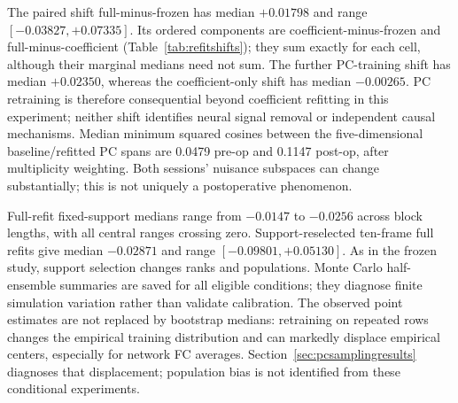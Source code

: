 \documentclass[11pt,a4paper]{article}
\begin{document}
The paired shift full-minus-frozen has median $+0.01798$ and range $[-0.03827,+0.07335]$. Its ordered components are coefficient-minus-frozen and full-minus-coefficient (Table~\ref{tab:refitshifts}); they sum exactly for each cell, although their marginal medians need not sum. The further PC-training shift has median $+0.02350$, whereas the coefficient-only shift has median $-0.00265$. PC retraining is therefore consequential beyond coefficient refitting in this experiment; neither shift identifies neural signal removal or independent causal mechanisms. Median minimum squared cosines between the five-dimensional baseline/refitted PC spans are 0.0479 pre-op and 0.1147 post-op, after multiplicity weighting. Both sessions' nuisance subspaces can change substantially; this is not uniquely a postoperative phenomenon.
\begin{table}[H]\centering\small
\caption{Paired shifts of the longitudinal contrast, fixed support and ten-frame blocks. Every subtraction uses the same SC bootstrap and FC draw, not differences between unpaired distributions.}\label{tab:refitshifts}\end{table}
\begin{table}[H]\centering\scriptsize\setlength{\tabcolsep}{4pt}
\caption{All primary block-length/support/model combinations. Each range uses 200 eligible paired FC draws and 500 SC draws. Centers and widths depend on both retraining and temporal scale; no setting is selected by its sign.}\label{tab:refitblocks}\end{table}

Full-refit fixed-support medians range from $-0.0147$ to $-0.0256$ across block lengths, with all central ranges crossing zero. Support-reselected ten-frame full refits give median $-0.02871$ and range $[-0.09801,+0.05130]$. As in the frozen study, support selection changes ranks and populations. Monte Carlo half-ensemble summaries are saved for all eligible conditions; they diagnose finite simulation variation rather than validate calibration. The observed point estimates are not replaced by bootstrap medians: retraining on repeated rows changes the empirical training distribution and can markedly displace empirical centers, especially for network FC averages. Section~\ref{sec:pcsamplingresults} diagnoses that displacement; population bias is not identified from these conditional experiments.
\end{document}
